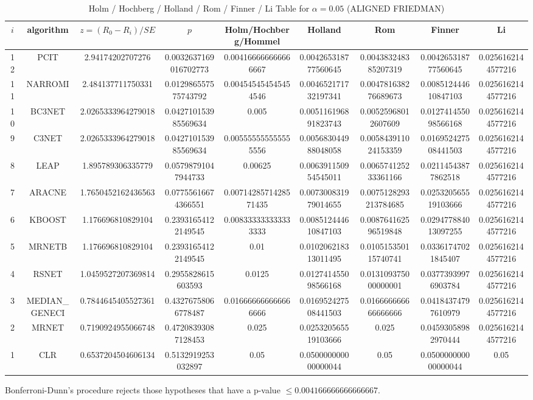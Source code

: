 \documentclass[a4paper,10pt]{article}
\begin{document}
\begin{landscape}
\begin{table}[!htp]
\centering\scriptsize
\caption{Holm / Hochberg / Holland / Rom / Finner / Li Table for $\alpha=0.05$ (ALIGNED FRIEDMAN)}
\begin{tabular}{ccccccccc}
$i$&algorithm&$z=(R_0 - R_i)/SE$&$p$&Holm/Hochberg/Hommel&Holland&Rom&Finner&Li\\
\hline
12&PCIT&2.94174202707276&0.0032637169016702773&0.004166666666666667&0.004265318777560645&0.004383248385207319&0.004265318777560645&0.0256162144577216\\
11&NARROMI&2.484137711750331&0.012986557575743792&0.004545454545454546&0.004652171732197341&0.004781638276689673&0.008512444610847103&0.0256162144577216\\
10&BC3NET&2.0265333964279018&0.042710153985569634&0.005&0.005116196891823743&0.00525968012607609&0.012741455098566168&0.0256162144577216\\
9&C3NET&2.0265333964279018&0.042710153985569634&0.005555555555555556&0.005683044988048058&0.005843911024153359&0.016952427508441503&0.0256162144577216\\
8&LEAP&1.895789306335779&0.05798791047944733&0.00625&0.006391150954545011&0.006574125233361166&0.02114543877862518&0.0256162144577216\\
7&ARACNE&1.7650452162436563&0.07755616674366551&0.0071428571428571435&0.007300831979014655&0.0075128293213784685&0.025320565519103666&0.0256162144577216\\
6&KBOOST&1.176696810829104&0.23931654122149545&0.008333333333333333&0.008512444610847103&0.008764162596519848&0.029477884013097255&0.0256162144577216\\
5&MRNETB&1.176696810829104&0.23931654122149545&0.01&0.010206218313011495&0.010515350115740741&0.03361747021845407&0.0256162144577216\\
4&RSNET&1.0459527207369814&0.2955828615603593&0.0125&0.012741455098566168&0.013109375000000001&0.03773939976903784&0.0256162144577216\\
3&MEDIAN_GENECI&0.7844645405527361&0.43276758066778487&0.016666666666666666&0.016952427508441503&0.016666666666666666&0.04184374797610979&0.0256162144577216\\
2&MRNET&0.7190924955066748&0.47208393087128453&0.025&0.025320565519103666&0.025&0.04593058982970444&0.0256162144577216\\
1&CLR&0.6537204504606134&0.5132919253032897&0.05&0.050000000000000044&0.05&0.050000000000000044&0.05\\
\hline
\end{tabular}
\end{table}
Bonferroni-Dunn's procedure rejects those hypotheses that have a p-value $\le0.004166666666666667$.



\end{landscape}
\end{document}

